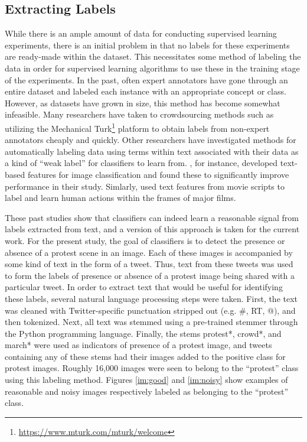 \documentclass[twoside,11pt]{article}
\begin{document}
\subsection{Extracting Labels}
While there is an ample amount of data for conducting supervised learning experiments, there is an initial problem in that no labels for these experiments are ready-made within the dataset. This necessitates some method of labeling the data in order for supervised learning algorithms to use these in the training stage of the experiments. In the past, often expert annotators have gone through an entire dataset and labeled each instance with an appropriate concept or class. However, as datasets have grown in size, this method has become somewhat infeasible. Many researchers have taken to crowdsourcing methods such as utilizing the Mechanical Turk\footnote{\url{https://www.mturk.com/mturk/welcome}} platform to obtain labels from non-expert annotators cheaply and quickly. Other researchers have investigated methods for automatically labeling data using terms within text associated with their data as a kind of ``weak label'' for classifiers to learn from. \cite{wang2009building}, for instance, developed text-based features for image classification and found these to significantly improve performance in their study. Simlarly, \cite{laptev2008learning} used text features from movie scripts to label and learn human actions within the frames of major films.
\par
These past studies show that classifiers can indeed learn a reasonable signal from labels extracted from text, and a version of this approach is taken for the current work. For the present study, the goal of classifiers is to detect the presence or absence of a protest scene in an image. Each of these images is accompanied by some kind of text in the form of a tweet. Thus, text from these tweets was used to form the labels of presence or absence of a protest image being shared with a particular tweet. In order to extract text that would be useful for identifying these labels, several natural language processing steps were taken. First, the text was cleaned with Twitter-specific punctuation stripped out (e.g. \#, RT, @), and then tokenized. Next, all text was stemmed using a pre-trained stemmer through the Python programming language. Finally, the stems protest*, crowd*, and march* were used as indicators of presence of a protest image, and tweets containing any of these stems had their images added to the positive class for protest images. Roughly 16,000 images were seen to belong to the ``protest'' class using this labeling method. Figures \ref{im:good} and \ref{im:noisy} show examples of reasonable and noisy images respectively labeled as belonging to the ``protest'' class.
\end{document}
